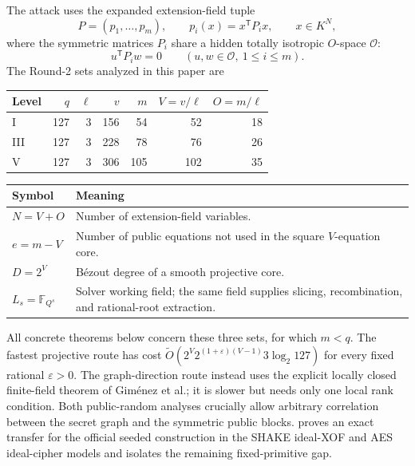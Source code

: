 \documentclass[11pt,a4paper]{article}
\theoremstyle{definition}
\theoremstyle{remark}
\newcommand{\F}{\mathbb F}
\newcommand{\cO}{\mathcal O}
\newcommand{\softO}{\widetilde O}
\begin{document}
The attack uses the expanded extension-field tuple
\[
P=(p_1,\ldots,p_m),\qquad p_i(x)=x^{\mathsf T}P_ix,
\qquad x\in K^{N},
\]
where the symmetric matrices $P_i$ share a hidden totally isotropic $O$-space $\cO$:
\begin{equation}\label{eq:isotropy}
u^{\mathsf T}P_iw=0\qquad(u,w\in\cO,\ 1\le i\le m).
\end{equation}
The Round-2 sets analyzed in this paper are
\begin{center}
\begin{tabular}{@{}lrrrrrr@{}}
\toprule
Level & $q$ & $\ell$ & $v$ & $m$ & $V=v/\ell$ & $O=m/\ell$\\
\midrule
I&127&3&156&54&52&18\\
III&127&3&228&78&76&26\\
V&127&3&306&105&102&35\\
\bottomrule
\end{tabular}
\end{center}

\begin{center}
\small
\setlength{\tabcolsep}{5pt}
\begin{tabularx}{0.94\textwidth}{@{}>{\bfseries}p{}X@{}}
\toprule
Symbol & Meaning \\
\midrule
$N=V+O$ & Number of extension-field variables. \\
$e=m-V$ & Number of public equations not used in the square $V$-equation core. \\
$D=2^V$ & B\'ezout degree of a smooth projective core. \\
$L_s=\F_{Q^s}$ & Solver working field; the same field supplies slicing, recombination, and rational-root extraction. \\
\bottomrule
\end{tabularx}
\end{center}

All concrete theorems below concern these three sets, for which $m<q$.  The fastest projective route has cost $\softO(2^V2^{(1+\varepsilon)(V-1)}3\log_2 127)$ for every fixed rational $\varepsilon>0$.  The graph-direction route instead uses the explicit locally closed finite-field theorem of Gim\'enez et al.; it is slower but needs only one local rank condition.  Both public-random analyses crucially allow arbitrary correlation between the secret graph and the symmetric public blocks.   proves an exact transfer for the official seeded construction in the SHAKE ideal-XOF and AES ideal-cipher models and isolates the remaining fixed-primitive gap.
\end{document}
